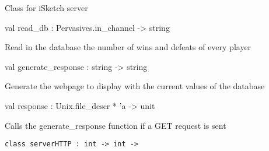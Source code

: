 \documentclass[11pt]{article}
\begin{document}
\begin{ocamldocdescription}
Class for iSketch server


\end{ocamldocdescription}




\label{val:Server.read-underscoredb}\begin{ocamldoccode}
val read_db : Pervasives.in_channel -> string
\end{ocamldoccode}
\begin{ocamldocdescription}
Read in the database the number of wins and defeats of every player


\end{ocamldocdescription}




\label{val:Server.generate-underscoreresponse}\begin{ocamldoccode}
val generate_response : string -> string
\end{ocamldoccode}
\begin{ocamldocdescription}
Generate the webpage to display with the current values of the database


\end{ocamldocdescription}




\label{val:Server.response}\begin{ocamldoccode}
val response : Unix.file_descr * 'a -> unit
\end{ocamldoccode}
\begin{ocamldocdescription}
Calls the generate\_response function if a GET request is sent


\end{ocamldocdescription}




\begin{ocamldoccode}
{\tt{class serverHTTP : }}{\tt{int -> int -> }}\end{ocamldoccode}
\label{class:Server.serverHTTP}
\end{document}
